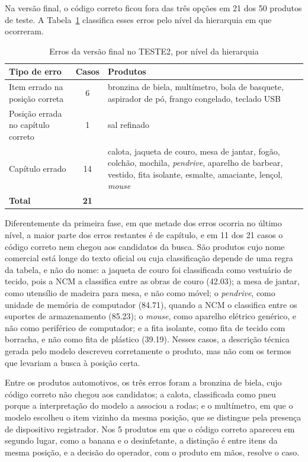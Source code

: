 Na versão final, o código correto ficou fora das três opções em 21 dos 50 produtos de teste. A Tabela~\ref{tab:erros} classifica esses erros pelo nível da hierarquia em que ocorreram.

\begin{table}[H]
\centering
\caption{Erros da versão final no TESTE2, por nível da hierarquia}
\label{tab:erros}
\begin{tabular}{p{4.4cm} c p{8.6cm}}
\hline
\textbf{Tipo de erro} & \textbf{Casos} & \textbf{Produtos} \\
\hline
Item errado na posição correta & 6 & bronzina de biela, multímetro, bola de basquete, aspirador de pó, frango congelado, teclado USB \\
Posição errada no capítulo correto & 1 & sal refinado \\
Capítulo errado & 14 & calota, jaqueta de couro, mesa de jantar, fogão, colchão, mochila, \textit{pendrive}, aparelho de barbear, vestido, fita isolante, esmalte, amaciante, lençol, \textit{mouse} \\
\hline
\textbf{Total} & \textbf{21} & \\
\hline
\end{tabular}
\end{table}

Diferentemente da primeira fase, em que metade dos erros ocorria no último nível, a maior parte dos erros restantes é de capítulo, e em 11 dos 21 casos o código correto nem chegou aos candidatos da busca. São produtos cujo nome comercial está longe do texto oficial ou cuja classificação depende de uma regra da tabela, e não do nome: a jaqueta de couro foi classificada como vestuário de tecido, pois a NCM a classifica entre as obras de couro (42.03); a mesa de jantar, como utensílio de madeira para mesa, e não como móvel; o \textit{pendrive}, como unidade de memória de computador (84.71), quando a NCM o classifica entre os suportes de armazenamento (85.23); o \textit{mouse}, como aparelho elétrico genérico, e não como periférico de computador; e a fita isolante, como fita de tecido com borracha, e não como fita de plástico (39.19). Nesses casos, a descrição técnica gerada pelo modelo descreveu corretamente o produto, mas não com os termos que levariam a busca à posição certa.

Entre os produtos automotivos, os três erros foram a bronzina de biela, cujo código correto não chegou aos candidatos; a calota, classificada como pneu porque a interpretação do modelo a associou a rodas; e o multímetro, em que o modelo escolheu o item vizinho da mesma posição, que se distingue pela presença de dispositivo registrador. Nos 5 produtos em que o código correto apareceu em segundo lugar, como a banana e o desinfetante, a distinção é entre itens da mesma posição, e a decisão do operador, com o produto em mãos, resolve o caso.

